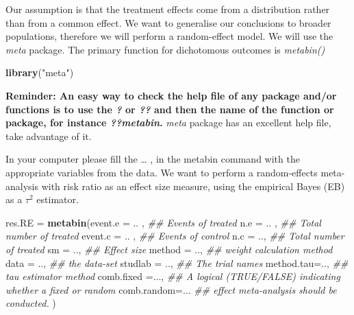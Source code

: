 \documentclass[]{article}
\newenvironment{Shaded}{\begin{snugshade}}{\end{snugshade}}
\newcommand{\CommentTok}[1]{\textcolor[rgb]{0.56,0.35,0.01}{\textit{#1}}}
\newcommand{\DataTypeTok}[1]{\textcolor[rgb]{0.13,0.29,0.53}{#1}}
\newcommand{\KeywordTok}[1]{\textcolor[rgb]{0.13,0.29,0.53}{\textbf{#1}}}
\newcommand{\NormalTok}[1]{#1}
\newcommand{\StringTok}[1]{\textcolor[rgb]{0.31,0.60,0.02}{#1}}
\begin{document}
Our assumption is that the treatment effects come from a distribution
rather than from a common effect. We want to generalise our conclusions
to broader populations, therefore we will perform a random-effect model.
We will use the \emph{meta} package. The primary function for
dichotomous outcomes is \emph{metabin()}

\begin{Shaded}
\begin{Highlighting}[]
\KeywordTok{library}\NormalTok{(}\StringTok{"meta"}\NormalTok{)}
\end{Highlighting}
\end{Shaded}

\textbf{Reminder: An easy way to check the help file of any package
and/or functions is to use the \emph{?} or \emph{??} and then the name
of the function or package, for instance \emph{??metabin}.} \emph{meta}
package has an excellent help file, take advantage of it.

\newline 

\newline  \newline

\newline 

In your computer please fill the \ldots{} , in the metabin command with
the appropriate variables from the data. We want to perform a
random-effects meta-analysis with risk ratio as an effect size measure,
using the empirical Bayes (EB) as a \(\tau^2\) estimator.

\begin{Shaded}
\begin{Highlighting}[]
\NormalTok{res.RE =}\StringTok{ }\KeywordTok{metabin}\NormalTok{(}\DataTypeTok{event.e =}\NormalTok{ .. ,      }\CommentTok{## Events of treated}
                 \DataTypeTok{n.e =}\NormalTok{ .. ,          }\CommentTok{## Total number of treated}
                 \DataTypeTok{event.c =}\NormalTok{ .. ,      }\CommentTok{## Events of control}
                 \DataTypeTok{n.c =}\NormalTok{ ..,           }\CommentTok{## Total number of treated}
                 \DataTypeTok{sm =}\NormalTok{ ..,            }\CommentTok{## Effect size}
                 \DataTypeTok{method =}\NormalTok{ ..,        }\CommentTok{## weight calculation method}
                 \DataTypeTok{data =}\NormalTok{ ..,          }\CommentTok{## the data-set}
                 \DataTypeTok{studlab =}\NormalTok{ ..,       }\CommentTok{## The trial names}
                 \DataTypeTok{method.tau=}\NormalTok{..,      }\CommentTok{## tau estimator method}
                 \DataTypeTok{comb.fixed =}\NormalTok{...,    }\CommentTok{## A logical (TRUE/FALSE) indicating whether a fixed or random  }
                 \DataTypeTok{comb.random=}\NormalTok{...     }\CommentTok{## effect meta-analysis should be conducted.}
\NormalTok{                 )}
\end{Highlighting}
\end{Shaded}
\end{document}
